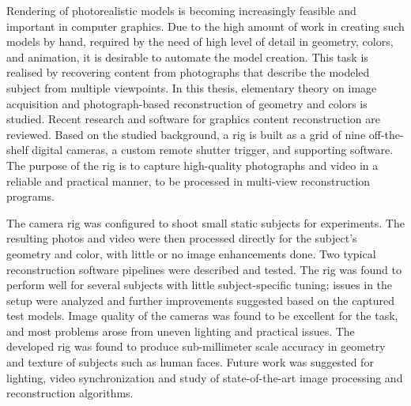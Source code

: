\begin{abstractpage}[english]
Rendering of photorealistic models is becoming increasingly feasible and important in computer graphics.
Due to the high amount of work in creating such models by hand, required by the need of high level of detail in geometry, colors, and animation, it is desirable to automate the model creation.
This task is realised by recovering content from photographs that describe the modeled subject from multiple viewpoints.
In this thesis, elementary theory on image acquisition and photograph-based reconstruction of geometry and colors is studied.
Recent research and software for graphics content reconstruction are reviewed.
Based on the studied background, a rig is built as a grid of nine off-the-shelf digital cameras, a custom remote shutter trigger, and supporting software.
The purpose of the rig is to capture high-quality photographs and video in a reliable and practical manner, to be processed in multi-view reconstruction programs.

The camera rig was configured to shoot small static subjects for experiments.
The resulting photos and video were then processed directly for the subject's geometry and color, with little or no image enhancements done.
Two typical reconstruction software pipelines were described and tested.
The rig was found to perform well for several subjects with little subject-specific tuning;
issues in the setup were analyzed and further improvements suggested based on the captured test models.
Image quality of the cameras was found to be excellent for the task, and most problems arose from uneven lighting and practical issues.
The developed rig was found to produce sub-millimeter scale accuracy in geometry and texture of subjects such as human faces.
Future work was suggested for lighting, video synchronization and study of state-of-the-art image processing and reconstruction algorithms.
\end{abstractpage}

\newpage

